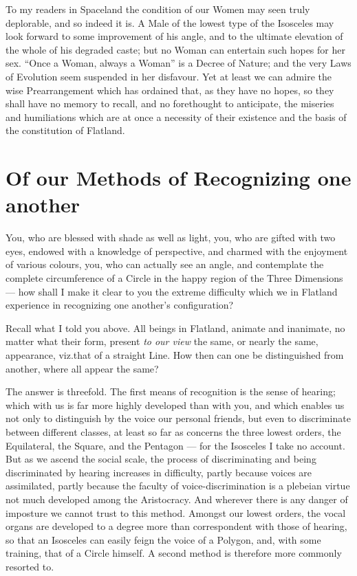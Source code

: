 \documentclass[10pt, kindle, oneside]{kindle}
\begin{document}
To my readers in Spaceland the condition of our Women may seen truly
deplorable, and so indeed it is. A Male of the lowest type of the Isosceles
may look forward to some improvement of his angle, and to the ultimate
elevation of the whole of his degraded caste; but no Woman can entertain such
hopes for her sex. ``Once a Woman, always a Woman'' is a Decree of Nature; and
the very Laws of Evolution seem suspended in her disfavour. Yet at least we
can admire the wise Prearrangement which has ordained that, as they have no
hopes, so they shall have no memory to recall, and no forethought to
anticipate, the miseries and humiliations which are at once a necessity of
their existence and the basis of the constitution of Flatland.


\chapter{Of our Methods of Recognizing one another}


You, who are blessed with
shade as well as light, you, who are gifted with two eyes, endowed with a
knowledge of perspective, and charmed with the enjoyment of various colours,
you, who can actually see an angle, and contemplate the complete circumference
of a Circle in the happy region of the Three Dimensions --- how shall I make it
clear to you the extreme difficulty which we in Flatland experience in
recognizing one another's configuration?

Recall what I told you above. All beings in Flatland, animate and inanimate,
no matter what their form, present \emph{to our view} the same, or nearly the same,
appearance, viz.\@ that of a straight Line. How then can one be distinguished
from another, where all appear the same?

The answer is threefold. The first means of recognition is the sense of
hearing; which with us is far more highly developed than with you, and which
enables us not only to distinguish by the voice our personal friends, but even
to discriminate between different classes, at least so far as concerns the
three lowest orders, the Equilateral, the Square, and the Pentagon --- for the
Isosceles I take no account. But as we ascend the social scale, the process of
discriminating and being discriminated by hearing increases in difficulty,
partly because voices are assimilated, partly because the faculty of
voice-discrimination is a plebeian virtue not much developed among the
Aristocracy. And wherever there is any danger of imposture we cannot trust to
this method. Amongst our lowest orders, the vocal organs are developed to a
degree more than correspondent with those of hearing, so that an Isosceles can
easily feign the voice of a Polygon, and, with some training, that of a Circle
himself. A second method is therefore more commonly resorted to.
\end{document}

